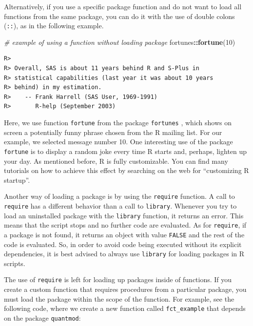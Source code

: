 \documentclass[
  12pt,
]{book}
\newenvironment{Shaded}{\begin{snugshade}}{\end{snugshade}}
\newcommand{\CommentTok}[1]{\textcolor[rgb]{0.37,0.37,0.37}{\textit{#1}}}
\newcommand{\DecValTok}[1]{\textcolor[rgb]{0.06,0.06,0.06}{#1}}
\newcommand{\KeywordTok}[1]{\textcolor[rgb]{0.27,0.27,0.27}{\textbf{#1}}}
\newcommand{\NormalTok}[1]{#1}
\newcommand{\OperatorTok}[1]{\textcolor[rgb]{0.43,0.43,0.43}{\textbf{#1}}}
\begin{document}
Alternatively, if you use a specific package function and do not want to load all functions from the same package, you can do it with the use of double colons (\texttt{::}), as in the following example. 

\begin{Shaded}
\begin{Highlighting}[]
\CommentTok{# example of using a function without loading package}
\NormalTok{fortunes}\OperatorTok{::}\KeywordTok{fortune}\NormalTok{(}\DecValTok{10}\NormalTok{)}
\end{Highlighting}
\end{Shaded}

\begin{verbatim}
R> 
R> Overall, SAS is about 11 years behind R and S-Plus in
R> statistical capabilities (last year it was about 10 years
R> behind) in my estimation.
R>    -- Frank Harrell (SAS User, 1969-1991)
R>       R-help (September 2003)
\end{verbatim}

Here, we use function \texttt{fortune} from the package \texttt{fortunes} \citep{R-fortunes}, which shows on screen a potentially funny phrase chosen from the R mailing list. For our example, we selected message number 10. One interesting use of the package \texttt{fortune} is to display a random joke every time R starts and, perhaps, lighten up your day. As mentioned before, R is fully customizable. You can find many tutorials on how to achieve this effect by searching on the web for ``customizing R startup''.

Another way of loading a package is by using the \texttt{require} function. A call to \texttt{require} has a different behavior than a call to \texttt{library}. Whenever you try to load an uninstalled package with the \texttt{library} function, it returns an error. This means that the script stops and no further code are evaluated. As for \texttt{require}, if a package is not found, it returns an object with value \texttt{FALSE} and the rest of the code is evaluated. So, in order to avoid code being executed without its explicit dependencies, it is best advised to always use \texttt{library} for loading packages in R scripts. 

The use of \texttt{require} is left for loading up packages inside of functions. If you create a custom function that requires procedures from a particular package, you must load the package within the scope of the function. For example, see the following code, where we create a new function called \texttt{fct\_example} that depends on the package \texttt{quantmod}:
\end{document}
